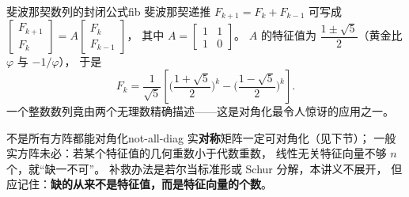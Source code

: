\documentclass[11pt,a4paper,openany]{ctexbook}
\begin{document}
\begin{exmp}{斐波那契数列的封闭公式}{fib}
斐波那契递推 $F_{k+1}=F_k+F_{k-1}$ 可写成
$\begin{bmatrix}F_{k+1}\\F_k\end{bmatrix}
=A\begin{bmatrix}F_k\\F_{k-1}\end{bmatrix}$，
其中 $A=\begin{bmatrix}1&1\\1&0\end{bmatrix}$。
$A$ 的特征值为 $\dfrac{1\pm\sqrt5}{2}$（黄金比 $\varphi$ 与 $-1/\varphi$），
于是
\[
F_k=\frac{1}{\sqrt5}\left[\Big(\frac{1+\sqrt5}{2}\Big)^{k}
-\Big(\frac{1-\sqrt5}{2}\Big)^{k}\right].
\]
一个整数数列竟由两个无理数精确描述——这是对角化最令人惊讶的应用之一。
\end{exmp}

\begin{remk}{不是所有方阵都能对角化}{not-all-diag}
实\textbf{对称}矩阵一定可对角化（见下节）；
一般实方阵未必：若某个特征值的几何重数小于代数重数，
线性无关特征向量不够 $n$ 个，就“缺一不可”。
补救办法是若尔当标准形或 Schur 分解，本讲义不展开，
但应记住：\textbf{缺的从来不是特征值，而是特征向量的个数}。
\end{remk}
\end{document}
